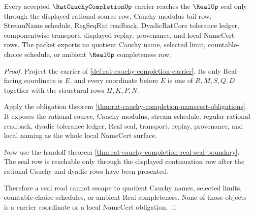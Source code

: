 \begin{theorem}
\label{thm:rat-cauchy-completion-seal-nonescape}
Every accepted $\RatCauchyCompletionUp$ carrier reaches the $\RealUp$ seal only through the displayed rational source row, Cauchy-modulus tail row, StreamName schedule, RegSeqRat readback, DyadicRatCore tolerance ledger, componentwise transport, displayed replay, provenance, and local NameCert rows. The packet exports no quotient Cauchy name, selected limit, countable-choice schedule, or ambient $\RealUp$ completeness row.
\end{theorem}
\begin{proof}
Project the carrier of \autoref{def:rat-cauchy-completion-carrier}. Its only Real-facing coordinate is $E$, and every coordinate before $E$ is one of $R,M,S,Q,D$ together with the structural rows $H,K,P,N$.

Apply the obligation theorem \autoref{thm:rat-cauchy-completion-namecert-obligations}. It exposes the rational source, Cauchy modulus, stream schedule, regular rational readback, dyadic tolerance ledger, Real seal, transport, replay, provenance, and local naming as the whole local NameCert surface.

Now use the handoff theorem \autoref{thm:rat-cauchy-completion-real-seal-boundary}. The seal row is reachable only through the displayed continuation row after the rational-Cauchy and dyadic rows have been presented.

Therefore a seal read cannot escape to quotient Cauchy names, selected limits, countable-choice schedules, or ambient Real completeness. None of those objects is a carrier coordinate or a local NameCert obligation.
\end{proof}


\begin{closurestatus}{\RatCauchyCompletionUp}
  \theoryclosure{\seedClosure}
  \formalstatus{\unformalizedV}
\end{closurestatus}
